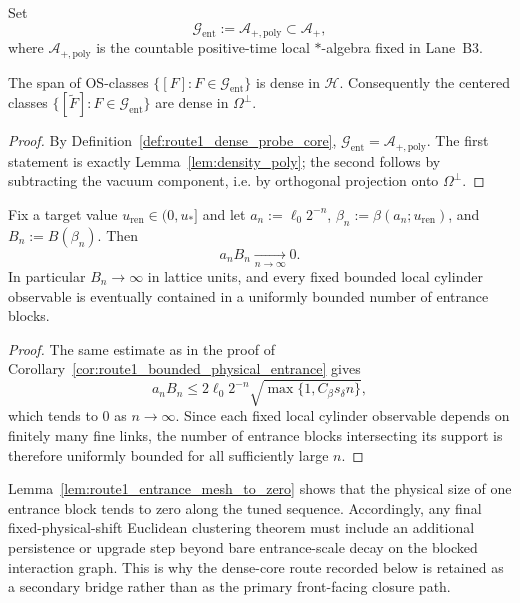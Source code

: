\begin{definition}
\label{def:route1_dense_probe_core}
Set
\[
\mathcal G_{\mathrm{ent}}:=\mathcal A_{+,\mathrm{poly}}\subset\mathcal A_+,
\]
where $\mathcal A_{+,\mathrm{poly}}$ is the countable positive-time local $*$-algebra fixed in Lane~B3.
\end{definition}

\begin{lemma}
\label{lem:route1_probe_core_dense}
The span of OS-classes $\{[F]:F\in\mathcal G_{\mathrm{ent}}\}$ is dense in $\mathcal H$.
Consequently the centered classes $\{[\widetilde F]:F\in\mathcal G_{\mathrm{ent}}\}$ are dense in $\Omega^\perp$.
\end{lemma}

\begin{proof}
By Definition~\ref{def:route1_dense_probe_core}, $\mathcal G_{\mathrm{ent}}=\mathcal A_{+,\mathrm{poly}}$.
The first statement is exactly Lemma~\ref{lem:density_poly}; the second follows by subtracting the vacuum component, i.e. by orthogonal projection onto $\Omega^\perp$.
\end{proof}

\begin{lemma}
\label{lem:route1_entrance_mesh_to_zero}
Fix a target value $u_{\mathrm{ren}}\in(0,u_\ast]$ and let $a_n:=\ell_0 2^{-n}$, $\beta_n:=\beta(a_n;u_{\mathrm{ren}})$, and $B_n:=B(\beta_n)$.
Then
\[
 a_n B_n\xrightarrow[n\to\infty]{}0.
\]
In particular $B_n\to\infty$ in lattice units, and every fixed bounded local cylinder observable is eventually contained in a uniformly bounded number of entrance blocks.
\end{lemma}

\begin{proof}
The same estimate as in the proof of Corollary~\ref{cor:route1_bounded_physical_entrance} gives
\[
 a_n B_n
 \le 2\ell_0 2^{-n}\sqrt{\max\{1,C_{\beta}s_{\delta}n\}},
\]
which tends to $0$ as $n\to\infty$.
Since each fixed local cylinder observable depends on finitely many fine links, the number of entrance blocks intersecting its support is therefore uniformly bounded for all sufficiently large $n$.
\end{proof}

\begin{remark}
Lemma~\ref{lem:route1_entrance_mesh_to_zero} shows that the physical size of one entrance block tends to zero along the tuned sequence.
Accordingly, any final fixed-physical-shift Euclidean clustering theorem must include an additional persistence or upgrade step beyond bare entrance-scale decay on the blocked interaction graph.
This is why the dense-core route recorded below is retained as a secondary bridge rather than as the primary front-facing closure path.
\end{remark}

